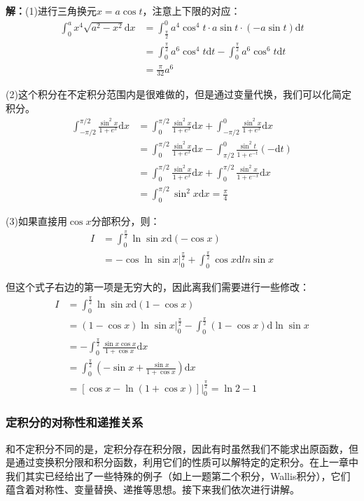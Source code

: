 \documentclass{ctexart}
\let\oldtextbf\textbf %
\renewcommand{\textbf}[1]{\textcolor{btex}{\oldtextbf{#1}}} %
\begin{document}
\textbf{解：}(1)进行三角换元$x=a\cos t$，注意上下限的对应：
\begin{align*}
\int_0^a x^4\sqrt{a^2-x^2}\mathrm{d}x&=\int_\frac{\pi}{2}^0a^4\cos^4t\cdot a\sin t\cdot (-a\sin t)\mathrm{d}t\\
&=\int_0^\frac{\pi}{2}a^6\cos^4t\mathrm{d}t- \int_0^\frac{\pi}{2}a^6\cos^6t\mathrm{d}t  \\
&=\frac{\pi}{32}a^6  
\end{align*}

(2)这个积分在不定积分范围内是很难做的，但是通过变量代换，我们可以化简定积分。
\begin{align*}
\int_{-\pi/2}^{\pi/2}\frac{\sin ^2x}{1+e^x}\mathrm{d}x&=\int_{0}^{\pi/2}\frac{\sin ^2x}{1+e^x}\mathrm{d}x+\int_{-\pi/2}^{0}\frac{\sin ^2x}{1+e^x}\mathrm{d}x\\
&=\int_{0}^{\pi/2}\frac{\sin ^2x}{1+e^x}\mathrm{d}x-\int_{\pi/2}^0\frac{\sin^2 t}{1+e^{-t}}(-\mathrm{d}t) \\
&=\int_{0}^{\pi/2}\frac{\sin ^2x}{1+e^x}\mathrm{d}x+\int_0^{\pi/2}\frac{\sin^2 x}{1+e^{-x}}\mathrm{d}x\\
&=\int_0^{\pi/2}\sin^2x\mathrm{d}x=\frac{\pi}{4}   
\end{align*}

(3)如果直接用$\cos x$分部积分，则：
\begin{align*}
    I&=\int_0^\frac{\pi}{2}\ln\sin x\mathrm{d}(-\cos x)\\
    &=-\cos \ln\sin x|_0^\frac{\pi}{2}+\int_0^\frac{\pi}{2}\cos x\mathrm{d}
    ln\sin x
\end{align*}

但这个式子右边的第一项是无穷大的，因此离我们需要进行一些修改：
\begin{align*}
    I&=\int_0^\frac{\pi}{2}\ln\sin x\mathrm{d}(1-\cos x)\\
        &=(1-\cos x)\ln\sin x|_0^\frac{\pi}{2}-\int_0^\frac{\pi}{2}(1-\cos x)\mathrm{d}\ln\sin x\\
     &=-\int_0^\frac{\pi}{2}\frac{\sin x\cos x}{1+\cos x}\mathrm{d}x\\
     &=\int_0^\frac{\pi}{2}(-\sin x+\frac{\sin x}{1+\cos x})\mathrm{d}x\\
    &=[\cos x-\ln(1+\cos x)]|_0^\frac{\pi}{2}=\ln 2-1
\end{align*}

\subsubsection{定积分的对称性和递推关系}
和不定积分不同的是，定积分存在积分限，因此有时虽然我们不能求出原函数，但是通过变换积分限和积分函数，利用它们的性质可以解特定的定积分。在上一章中我们其实已经给出了一些特殊的例子（如上一题第二个积分，Wallis积分），它们蕴含着对称性、变量替换、递推等思想。接下来我们依次进行讲解。
\end{document}
